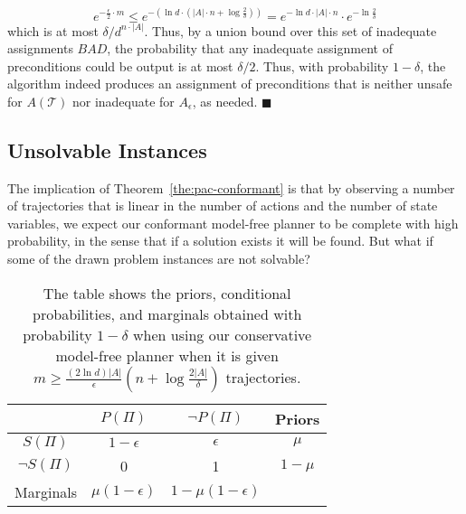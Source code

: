 \documentclass{article}
\newenvironment{proof}{\noindent{\bf Proof:~~}}{\qed}
\newcommand{\qed}{\hfill\ensuremath{\blacksquare}}
\newcommand{\solvable}{\textit{S}}
\newcommand{\plannable}{\textit{P}}
\begin{document}
\begin{proof}
		
		\begin{equation}
		e^{-\frac{\epsilon}{2} \cdot m}
		\leq 
		e^{-(\ln d \cdot (|A|\cdot n+\log\frac{2}{\delta}))}
		=e^{-\ln d \cdot |A|\cdot n}\cdot e^{-\ln  \frac{2}{\delta}}
		\end{equation}
		which is at most $\delta/d^{n\cdot |A|}$. Thus, by a union bound over this set of inadequate assignments $BAD$, the probability that any inadequate assignment of preconditions could be output is at most $\delta/2$.
		Thus, with probability $1-\delta$, the algorithm indeed produces an assignment of preconditions that is neither unsafe for $A(\mathcal{T})$ nor inadequate for $A_\epsilon$, as needed.
	\end{proof}
	
	\subsection{Unsolvable Instances}
	
	The implication of Theorem~\ref{the:pac-conformant} is that by observing 
	a number of trajectories that is linear in the number of actions and the number of state variables, 
	we expect our conformant model-free planner to be complete with high probability, in the sense that if a solution exists it will be found. But what if some of the drawn problem instances are not solvable? 

\begin{table}
	\centering
	\begin{tabular}{c|c|c|c}
			& $\plannable (\Pi)$ & $\neg\plannable(\Pi)$ & Priors \\ \hline
		$\solvable(\Pi)$ 		& $1-\epsilon$ & $\epsilon$ & $\mu$ \\
		$\neg\solvable(\Pi)$	& 0 & 1 & $1-\mu$ \\ \hline
		Marginals	& $\mu (1-\epsilon)$ & $1-\mu(1-\epsilon)$ &
	\end{tabular}
\caption{The table shows the priors, conditional probabilities, and marginals obtained with probability $1-\delta$ when using our conservative model-free planner when it is given $m\geq\frac{(2\ln  d)|A|}{\epsilon}(n+\log\frac{2|A|}{\delta})$ trajectories.}
\label{tab:probabilities}	
\end{table}
\end{document}

